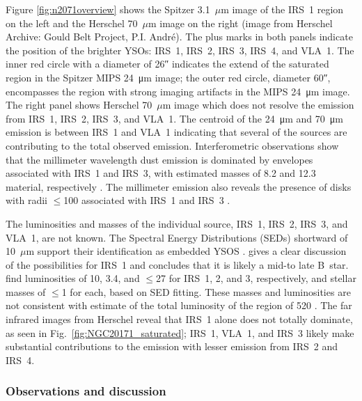 Figure \ref{fig:n2071overview} shows the Spitzer 3.1~$\mu$m image of the IRS~1 region on the left \citep[image from Spitzer Archive:][]{Megeath2012} and the Herschel 70~$\mu$m image on the right (image from Herschel Archive: Gould Belt Project, P.I. Andr\'e). The plus marks in both panels indicate the position of the brighter YSOs: IRS~1, IRS~2, IRS~3, IRS~4, and VLA~1. The inner red circle with a diameter of \ang{;;26} indicates the extend of the saturated region in the Spitzer MIPS \SI{24}{\um} image; the outer red circle, diameter \ang{;;60}, encompasses the region with strong imaging artifacts in the MIPS \SI{24}{\um} image.
The right panel shows Herschel 70~$\mu$m image which does not resolve the emission from IRS~1, IRS~2, IRS~3, and VLA~1. The centroid of the \SI{24}{\um} and \SI{70}{\um} emission is between IRS~1 and VLA~1 indicating that several of the sources are contributing to the total observed emission. Interferometric observations show that the millimeter wavelength dust emission is dominated by envelopes associated with IRS~1 and IRS~3, with estimated masses of 8.2 and \SI{12.3}{\Msun} material, respectively \citep{Kempen2012}. The millimeter emission also reveals the presence of disks with radii $\le$\SI{100}{\au} associated with IRS~1 and IRS~3 \citep{Kempen2012}.

The luminosities and masses of the individual source, IRS~1, IRS~2, IRS~3, and VLA~1, are not known. The Spectral Energy Distributions (SEDs) shortward of 10~$\mu$m support their identification as embedded YSOS \citep{Skinner2009}. \cite{Skinner2009} gives a clear discussion of the possibilities for IRS~1 and concludes that it is likely a mid-to late B~star. \cite{Kempen2012} find luminosities of 10, 3.4, and $\le$\SI{27}{\Lsun} for IRS~1, 2, and 3, respectively, and stellar masses of $\le$\SI{1}{\Msun} for each, based on SED fitting. These masses and luminosities are not consistent with estimate of the total luminosity of the region of \SI{520}{\Lsun} \citep{Butner1990}. The far infrared images from Herschel reveal that IRS~1 alone does not totally dominate, as seen in Fig.~\ref{fig:NGC20171_saturated}; IRS~1, VLA~1, and IRS~3 likely make substantial contributions to the emission with lesser emission from IRS~2 and IRS~4.

\subsubsection{Observations and discussion}

